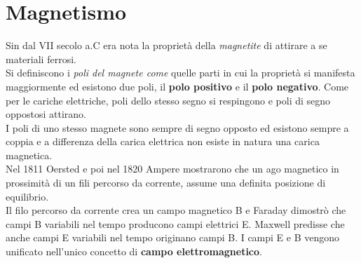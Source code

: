 \documentclass[12pt]{report}
\begin{document}
	\chapter{Magnetismo}
	Sin dal VII secolo a.C era nota la proprietà della \textit{magnetite} di attirare a se materiali ferrosi. \\
	Si definiscono i \textit{poli del magnete come} quelle parti in cui la proprietà si manifesta maggiormente ed esistono due poli, il \textbf{polo positivo} e il \textbf{polo negativo}. Come per le cariche elettriche, poli dello stesso segno si respingono e poli di segno oppostosi attirano.  \\
	I poli di uno stesso magnete sono sempre di segno opposto ed esistono sempre a coppia e a differenza della carica elettrica non esiste in natura una carica magnetica. \\
	Nel 1811 Oersted e poi nel 1820 Ampere mostrarono che un ago magnetico in prossimità di un fili percorso da corrente, assume una definita posizione di equilibrio. \\
	Il filo percorso da corrente crea un campo magnetico B e Faraday dimostrò che campi B variabili nel tempo producono campi elettrici E. Maxwell predisse che anche campi E variabili nel tempo originano campi B. I campi E e B vengono unificato nell'unico concetto di \textbf{campo elettromagnetico}.
\end{document}
